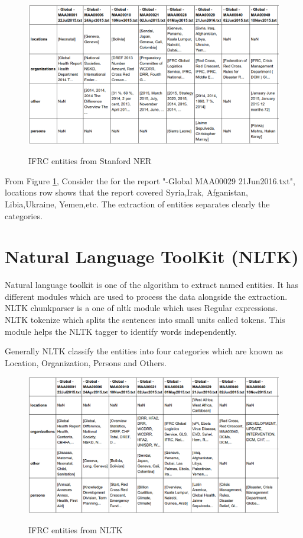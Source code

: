 \begin{figure}[hbtp]
\caption{IFRC entities from Stanford NER}
\centering\includegraphics[scale =.45]{images/stanford.png} \label{stanford}
\end{figure}
From Figure \ref{stanford},  Consider the for the report "-Global MAA00029 21Jun2016.txt", locations row  shows that the report covered Syria,Irak, Afganistan, Libia,Ukraine, Yemen,etc.
The extraction of entities separates clearly the categories.
\section{Natural Language ToolKit (NLTK)}
Natural language toolkit is one of the algorithm to extract named  entities. It has different modules which are used to process the data alongside the extraction.
NLTK chunkparser is a one of nltk module  which uses Regular expressions. NLTK tokenize which splits the sentences into small units called tokens. This module helps the NLTK tagger to identify words independently. 

Generally NLTK classify the entities into four categories which are known as Location, Organization, Persons and Others. 

\begin{figure}[hbtp]
\caption{IFRC entities from NLTK}
\centering
\includegraphics[scale=.45]{images/nltkalgo.png}\label{nltkalgo}
\end{figure}

